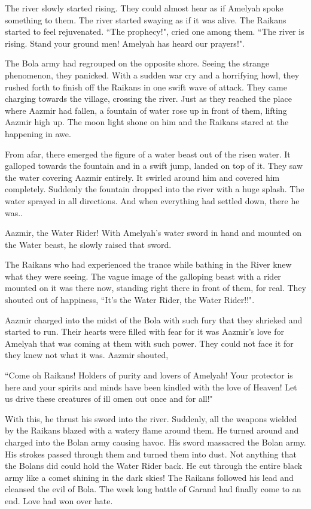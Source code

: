 \documentclass[twoside,11pt,titlepage]{article}
\begin{document}
The river slowly started rising. They could almost hear as if Amelyah spoke something to them. The river started swaying as if it was alive. The Raikans started to feel rejuvenated. ``The prophecy!", cried one among them. ``The river is rising. Stand your ground men! Amelyah has heard our prayers!".

The Bola army had regrouped on the opposite shore. Seeing the strange phenomenon, they panicked. With a sudden war cry and a horrifying howl, they rushed forth to finish off the Raikans in one swift wave of attack. They came charging towards the village, crossing the river. Just as they reached the place where Aazmir had fallen, a fountain of water rose up in front of them, lifting Aazmir high up. The moon light shone on him and the Raikans stared at the happening in awe.

From afar, there emerged the figure of a water beast out of the risen water. It galloped towards the fountain and in a swift jump, landed on top of it. They saw the water covering Aazmir entirely. It swirled around him and covered him completely. Suddenly the fountain dropped into the river with a huge splash. The water sprayed in all directions. And when everything had settled down, there he was..

Aazmir, the Water Rider! With Amelyah's water sword in hand and mounted on the Water beast, he slowly raised that sword.

The Raikans who had experienced the trance while bathing in the River knew what they were seeing. The vague image of the galloping beast with a rider mounted on it was there now, standing right there in front of them, for real. They shouted out of happiness, ``It's the Water Rider, the Water Rider!!".

Aazmir charged into the midst of the Bola with such fury that they shrieked and started to run. Their hearts were filled with fear for it was Aazmir's love for Amelyah that was coming at them with such power. They could not face it for they knew not what it was. Aazmir shouted,

``Come oh Raikans! Holders of purity and lovers of Amelyah! Your protector is here and your spirits and minds have been kindled with the love of Heaven! Let us drive these creatures of ill omen out once and for all!"

With this, he thrust his sword into the river. Suddenly, all the weapons wielded by the Raikans blazed with a watery flame around them. He turned around and charged into the Bolan army causing havoc. His sword massacred the Bolan army. His strokes passed through them and turned them into dust. Not anything that the Bolans did could hold the Water Rider back. He cut through the entire black army like a comet shining in the dark skies! The Raikans followed his lead and cleansed the evil of Bola. The week long battle of Garand had finally come to an end. Love had won over hate.
\end{document}
